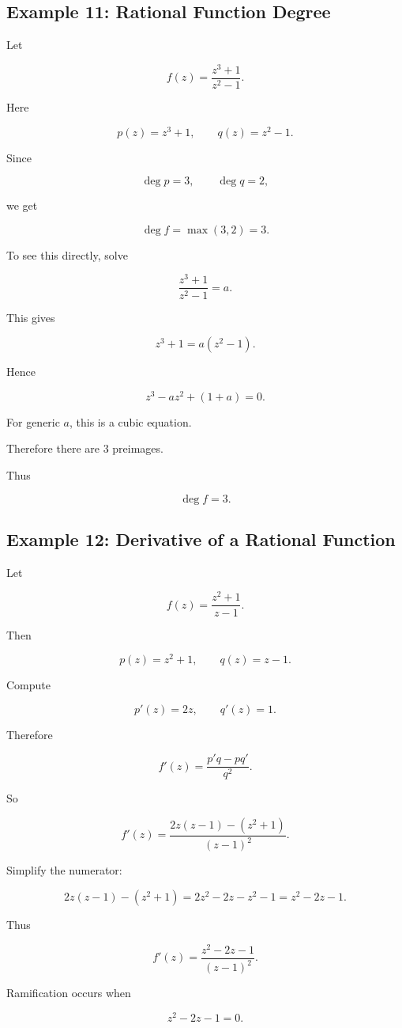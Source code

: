 \documentclass[12pt,a4paper]{article}
\theoremstyle{notespace}
\begin{document}
\subsection{Example 11: Rational Function Degree}

Let

\[
f(z)=\frac{z^3+1}{z^2-1}.
\]

Here

\[
p(z)=z^3+1,
\qquad
q(z)=z^2-1.
\]

Since

\[
\deg p=3,
\qquad
\deg q=2,
\]

we get

\[
\deg f=\max(3,2)=3.
\]

To see this directly, solve

\[
\frac{z^3+1}{z^2-1}=a.
\]

This gives

\[
z^3+1=a(z^2-1).
\]

Hence

\[
z^3-az^2+(1+a)=0.
\]

For generic \(a\), this is a cubic equation.

Therefore there are \(3\) preimages.

Thus

\[
\deg f=3.
\]

\subsection{Example 12: Derivative of a Rational Function}

Let

\[
f(z)=\frac{z^2+1}{z-1}.
\]

Then

\[
p(z)=z^2+1,
\qquad
q(z)=z-1.
\]

Compute

\[
p'(z)=2z,
\qquad
q'(z)=1.
\]

Therefore

\[
f'(z)
=
\frac{p'q-pq'}{q^2}.
\]

So

\[
f'(z)
=
\frac{2z(z-1)-(z^2+1)}
{(z-1)^2}.
\]

Simplify the numerator:

\[
2z(z-1)-(z^2+1)
=
2z^2-2z-z^2-1
=
z^2-2z-1.
\]

Thus

\[
f'(z)
=
\frac{z^2-2z-1}{(z-1)^2}.
\]

Ramification occurs when

\[
z^2-2z-1=0.
\]
\end{document}
